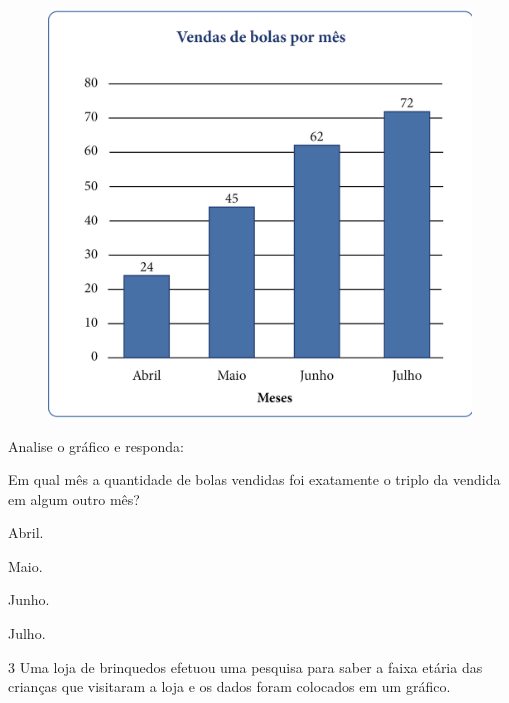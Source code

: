\begin{figure}[htpb!]
\centering
\includegraphics[width=\textwidth]{../ilustracoes/MAT5/SAEB_5ANO_MAT_figura65.png}
\end{figure}

Analise o gráfico e responda:

Em qual mês a quantidade de bolas vendidas foi exatamente o triplo da vendida em algum outro mês?

\begin{minipage}{.5\textwidth}
\begin{escolha}
\item
  Abril.
\item
  Maio.
\item
  Junho.
\item
  Julho.
\end{escolha}
\end{minipage}

\num{3} Uma loja de brinquedos efetuou uma pesquisa para
saber a faixa etária das crianças que visitaram a loja e os dados foram colocados em um gráfico.

